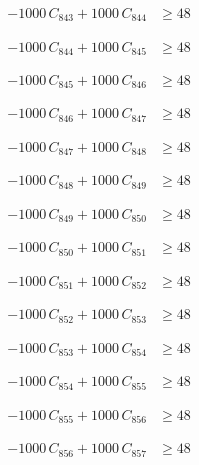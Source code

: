 \documentclass[a4paper,11pt]{article}
\begin{document}
\begin{align}
-1000\,C_{843} + 1000\,C_{844} &\geq 48 \nonumber
\end{align}

\begin{align}
-1000\,C_{844} + 1000\,C_{845} &\geq 48 \nonumber
\end{align}

\begin{align}
-1000\,C_{845} + 1000\,C_{846} &\geq 48 \nonumber
\end{align}

\begin{align}
-1000\,C_{846} + 1000\,C_{847} &\geq 48 \nonumber
\end{align}

\begin{align}
-1000\,C_{847} + 1000\,C_{848} &\geq 48 \nonumber
\end{align}

\begin{align}
-1000\,C_{848} + 1000\,C_{849} &\geq 48 \nonumber
\end{align}

\begin{align}
-1000\,C_{849} + 1000\,C_{850} &\geq 48 \nonumber
\end{align}

\begin{align}
-1000\,C_{850} + 1000\,C_{851} &\geq 48 \nonumber
\end{align}

\begin{align}
-1000\,C_{851} + 1000\,C_{852} &\geq 48 \nonumber
\end{align}

\begin{align}
-1000\,C_{852} + 1000\,C_{853} &\geq 48 \nonumber
\end{align}

\begin{align}
-1000\,C_{853} + 1000\,C_{854} &\geq 48 \nonumber
\end{align}

\begin{align}
-1000\,C_{854} + 1000\,C_{855} &\geq 48 \nonumber
\end{align}

\begin{align}
-1000\,C_{855} + 1000\,C_{856} &\geq 48 \nonumber
\end{align}

\begin{align}
-1000\,C_{856} + 1000\,C_{857} &\geq 48 \nonumber
\end{align}
\end{document}
